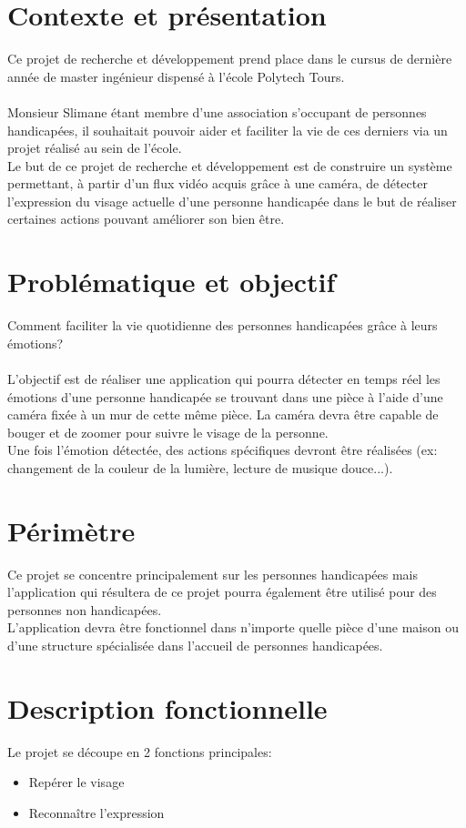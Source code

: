 \documentclass[overfullbox, poster]{polytech/polytech}
\begin{document}
\section{Contexte et présentation}
Ce projet de recherche et développement prend place dans le cursus de dernière année de master ingénieur dispensé à l'école Polytech Tours.\\
\\
Monsieur Slimane étant membre d'une association s'occupant de personnes handicapées, il souhaitait pouvoir aider et faciliter la vie de ces derniers via un projet réalisé au sein de l'école.\\
Le but de ce projet de recherche et développement est de construire un système permettant, à partir d'un flux vidéo acquis grâce à une caméra, de détecter l'expression du visage actuelle d'une personne handicapée dans le but de réaliser certaines actions pouvant améliorer son bien être.

\section{Problématique et objectif}
Comment faciliter la vie quotidienne des personnes handicapées grâce à leurs émotions?\\
\\
L'objectif est de réaliser une application qui pourra détecter en temps réel les émotions d'une personne handicapée se trouvant dans une pièce à l'aide d'une caméra fixée à un mur de cette même pièce. La caméra devra être capable de bouger et de zoomer pour suivre le visage de la personne.\\
Une fois l'émotion détectée, des actions spécifiques devront être réalisées (ex: changement de la couleur de la lumière, lecture de musique douce...).

\section{Périmètre}
Ce projet se concentre principalement sur les personnes handicapées mais l'application qui résultera de ce projet pourra également être utilisé pour des personnes non handicapées.\\
L'application devra être fonctionnel dans n'importe quelle pièce d'une maison ou d'une structure spécialisée dans l'accueil de personnes handicapées.

\section{Description fonctionnelle}
Le projet se découpe en 2 fonctions principales:
\begin{itemize}
\item Repérer le visage
\item Reconnaître l'expression\\
\end{itemize}
\end{document}
